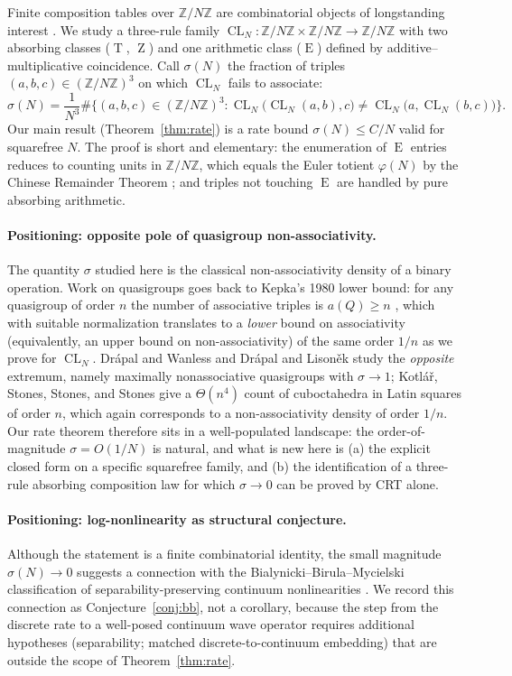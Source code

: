 \documentclass[11pt,reqno]{amsart}
\theoremstyle{plain}
\theoremstyle{definition}
\theoremstyle{remark}
\DeclareMathOperator{\CL}{CL}
\DeclareMathOperator{\ECHO}{E}
\DeclareMathOperator{\HARM}{T}
\DeclareMathOperator{\VOID}{Z}
\newcommand{\ZN}{\mathbb{Z}/N\mathbb{Z}}
\begin{document}
Finite composition tables over $\ZN$ are combinatorial objects of
longstanding interest \cite{Birkhoff1940,Ore1942,DummitFoote2004,Lang2002}.
We study a three-rule family $\CL_N:\ZN\times\ZN\to\ZN$ with two
absorbing classes ($\HARM$, $\VOID$) and one arithmetic class
($\ECHO$) defined by additive--multiplicative coincidence. Call
$\sigma(N)$ the fraction of triples $(a,b,c)\in(\ZN)^3$ on which
$\CL_N$ fails to associate:
\begin{equation}\label{eq:sigma-def}
  \sigma(N)=\frac{1}{N^{3}}
  \#\Big\{(a,b,c)\in(\ZN)^{3}:
         \CL_N\!\big(\CL_N(a,b),c\big)\neq\CL_N\!\big(a,\CL_N(b,c)\big)\Big\}.
\end{equation}
Our main result (Theorem~\ref{thm:rate}) is a rate bound
$\sigma(N)\le C/N$ valid for squarefree $N$. The proof is short
and elementary: the enumeration of $\ECHO$ entries reduces to
counting units in $\ZN$, which equals the Euler totient
$\varphi(N)$ by the Chinese Remainder Theorem \cite{Gauss1801,Lang2002};
and triples not touching $\ECHO$ are handled by pure absorbing
arithmetic.

\paragraph{Positioning: opposite pole of quasigroup non-associativity.}
The quantity $\sigma$ studied here is the classical
non-associativity density of a binary operation. Work on
quasigroups goes back to Kepka's 1980 lower bound: for any quasigroup
of order $n$ the number of associative triples is $a(Q)\ge n$
\cite{Kepka1980,DrapalKepka1985}, which with suitable normalization
translates to a \emph{lower} bound on associativity (equivalently,
an upper bound on non-associativity) of the same order $1/n$ as we
prove for $\CL_N$.
Dr\'{a}pal and Wanless \cite{DrapalWanless2021} and
Dr\'{a}pal and Lison\v{e}k \cite{DrapalLisonek2020} study the
\emph{opposite} extremum, namely maximally nonassociative
quasigroups with $\sigma\to 1$; Kotl\'{a}\v{r}, Stones, Stones, and
Stones \cite{KSSS2023} give a $\Theta(n^{4})$ count of
cuboctahedra in Latin squares of order $n$, which again corresponds
to a non-associativity density of order $1/n$. Our rate theorem
therefore sits in a well-populated landscape: the order-of-magnitude
$\sigma=O(1/N)$ is natural, and what is new here is (a) the
explicit closed form on a specific squarefree family, and (b) the
identification of a three-rule absorbing composition law for which
$\sigma\to 0$ can be proved by CRT alone.

\paragraph{Positioning: log-nonlinearity as structural conjecture.}
Although the statement is a finite combinatorial identity, the
small magnitude $\sigma(N)\to 0$ suggests a connection with the
Bialynicki--Birula--Mycielski classification of
separability-preserving continuum nonlinearities \cite{BB1976}.
We record this connection as Conjecture~\ref{conj:bb}, not a
corollary, because the step from the discrete rate to a well-posed
continuum wave operator requires additional hypotheses
(separability; matched discrete-to-continuum embedding) that are
outside the scope of Theorem~\ref{thm:rate}.
\end{document}
